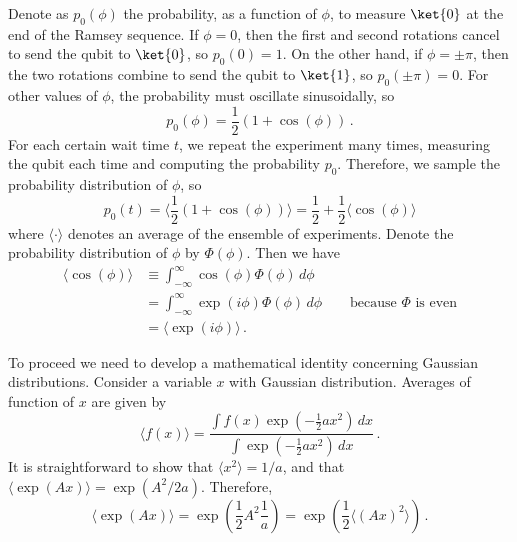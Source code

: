 Denote as $p_0(\phi)$ the probability, as a function of $\phi$, to measure $\ket{0}$ at the end of the Ramsey sequence.
If $\phi = 0$, then the first and second rotations cancel to send the qubit to $\ket{0}$, so $p_0(0) = 1$.
On the other hand, if $\phi = \pm \pi$, then the two rotations combine to send the qubit to $\ket{1}$, so $p_0(\pm \pi) = 0$.
For other values of $\phi$, the probability must oscillate sinusoidally, so
\begin{equation}
  p_0 (\phi) = \frac{1}{2}\left(1 + \cos(\phi) \right) \, .
\end{equation}
For each certain wait time $t$, we repeat the experiment many times, measuring the qubit each time and computing the probability $p_0$.
Therefore, we sample the probability distribution of $\phi$, so
\begin{equation}
  p_0(t)
  = \langle\frac{1}{2}\left(1+\cos(\phi)\right)\rangle
  = \frac{1}{2}+\frac{1}{2}\langle\cos(\phi)\rangle
\end{equation}
where $\langle \cdot \rangle$ denotes an average of the ensemble of experiments.
Denote the probability distribution of $\phi$ by $\Phi(\phi)$.
Then we have
\begin{align}
  \langle\cos\left(\phi\right)\rangle
  & \equiv \int_{-\infty}^{\infty}\cos(\phi)\Phi(\phi)\, d\phi \nonumber \\
  & = \int_{-\infty}^{\infty}\exp(i\phi)\Phi(\phi)\, d\phi\qquad\textrm{because }\Phi\textrm{ is even} \nonumber \\
  & = \langle\exp(i\phi)\rangle \, .
\end{align}

To proceed we need to develop a mathematical identity concerning Gaussian distributions.
Consider a variable $x$ with Gaussian distribution.
Averages of function of $x$ are given by
\begin{equation}
  \langle f(x)\rangle
  = \frac{\int f(x)\exp(-\frac{1}{2}ax^{2})\, dx}{\int\exp(-\frac{1}{2}ax^{2})\, dx} \, .
\end{equation}
It is straightforward to show that $\langle x^{2}\rangle = 1 / a$, and that $\langle\exp(Ax)\rangle = \exp(A^2 / 2 a)$.
Therefore,
\begin{equation}
  \langle \exp(Ax)\rangle
  = \exp\left(\frac{1}{2}A^{2}\frac{1}{a}\right)
  = \exp \left( \frac{1}{2}\langle(Ax)^{2}\rangle \right) \, .
\end{equation}

